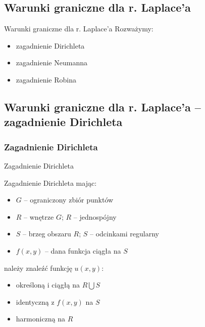 \subsection{Warunki graniczne dla r. Laplace'a}

\begin{frame}{Warunki graniczne dla r. Laplace'a}
  Rozważymy:
  \begin{itemize}
    \item zagadnienie Dirichleta
    \item zagadnienie Neumanna
    \item zagadnienie Robina
  \end{itemize}
\end{frame}

\subsection*{Warunki graniczne dla r. Laplace'a -- zagadnienie Dirichleta}
\subsubsection{Zagadnienie Dirichleta}

\begin{frame}{Zagadnienie Dirichleta}
  \begin{block}{Zagadnienie Dirichleta}
    mając:
    \begin{itemize}
      \item $G$ -- ograniczony zbiór punktów
      \item $R$ -- wnętrze $G$; $R$ -- jednospójny
      \item $S$ -- brzeg obszaru $R$; $S$ -- odcinkami regularny
      \item $f(x,y)$ -- dana funkcja ciągła na $S$
    \end{itemize}
    należy znaleźć funkcję $u(x,y)$:
    \begin{itemize}
      \item określoną i ciągłą na $R \bigcup S$
      \item identyczną z $f(x,y)$ na $S$
      \item harmoniczną na $R$
    \end{itemize}
  \end{block}
\end{frame}

